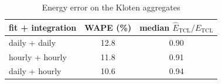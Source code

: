 \begin{table}[t]
\centering
\caption{Energy error on the Kloten aggregates}
\label{tab:energy}
\begin{tabular}{lcc}
\toprule
fit + integration & WAPE (\%) & median $\hat{E}_{\mathrm{TCL}}/E_{\mathrm{TCL}}$ \\
\midrule
daily + daily & 12.8 & 0.90 \\
hourly + hourly & 11.8 & 0.91 \\
daily + hourly & 10.6 & 0.94 \\
\bottomrule
\end{tabular}
\end{table}